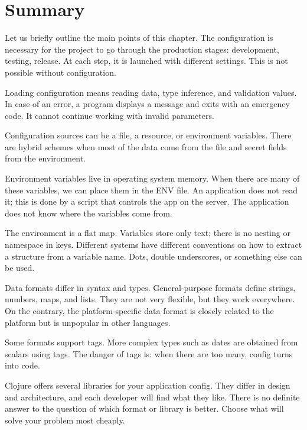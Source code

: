 \section{Summary}

Let us briefly outline the main points of this chapter. The configuration is necessary for the project to go through the production stages: development, testing, release. At each step, it is launched with different settings. This is not possible without configuration.

Loading configuration means reading data, type inference, and validation values. In case of an error, a program displays a message and exits with an emergency code. It cannot continue working with invalid parameters.

Configuration sources can be a file, a resource, or environment variables. There are hybrid schemes when most of the data come from the file and secret fields from the environment.

Environment variables live in operating system memory. When there are many of these variables, we can place them in the ENV file. An application does not read it; this is done by a script that controls the app on the server. The application does not know where the variables come from.

The environment is a flat map. Variables store only text; there is no nesting or namespace in keys. Different systems have different conventions on how to extract a structure from a variable name. Dots, double underscores, or something else can be used.

Data formats differ in syntax and types. General-purpose formats define strings, numbers, maps, and lists. They are not very flexible, but they work everywhere. On the contrary, the platform-specific data format is closely related to the platform but is unpopular in other languages.

Some formats support tags. More complex types such as dates are obtained from scalars using tags. The danger of tags is: when there are too many, config turns into code.

Clojure offers several libraries for your application config. They differ in design and architecture, and each developer will find what they like. There is no definite answer to the question of which format or library is better. Choose what will solve your problem most cheaply.
